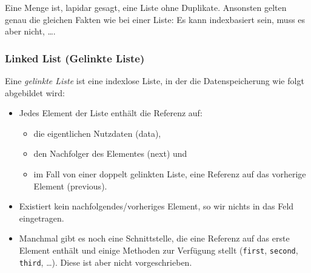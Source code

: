 		Eine Menge ist, lapidar gesagt, eine Liste ohne Duplikate. Ansonsten gelten genau die gleichen Fakten wie bei einer Liste: Es kann indexbasiert sein, muss es aber nicht, \dots.
	
	\subsubsection{Linked List (Gelinkte Liste)}
		Eine \textit{gelinkte Liste} ist eine indexlose Liste, in der die Datenspeicherung wie folgt abgebildet wird:
		\begin{itemize}
			\item Jedes Element der Liste enthält die Referenz auf:
				\begin{itemize}
					\item die eigentlichen Nutzdaten (data),
					\item den Nachfolger des Elementes (next) und
					\item im Fall von einer doppelt gelinkten Liste, eine Referenz auf das vorherige Element (previous).
				\end{itemize}
			\item Existiert kein nachfolgendes/vorheriges Element, so wir nichts in das Feld eingetragen.
			\item Manchmal gibt es noch eine Schnittstelle, die eine Referenz auf das erste Element enthält und einige Methoden zur Verfügung stellt (\texttt{first}, \texttt{second}, \texttt{third}, \dots). Diese ist aber nicht vorgeschrieben.
		\end{itemize}
		
